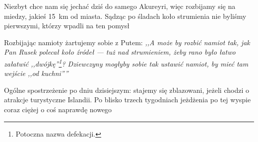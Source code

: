 Niezbyt chce nam się jechać dziś do samego Akureyri, więc rozbijamy się na miedzy, jakieś 15~km od miasta. Sądząc po śladach koło strumienia nie byliśmy pierwszymi, którzy wpadli na ten pomysł \grin

Rozbijając namioty żartujemy sobie z Putem: \emph{,,A może by rozbić namiot tak, jak Pan Rusek polecał koło źródeł --- tuż nad strumieniem, żeby rano było łatwo załatwić ,,dwójkę''\footnote{Potoczna nazwa defekacji.}? Dziewczyny mogłyby sobie tak ustawić namiot, by mieć tam wejście ,,od kuchni''\textellipsis''}


Ogólne spostrzeżenie po dniu dzisiejszym: stajemy się zblazowani, jeżeli chodzi o atrakcje turystyczne Islandii. Po blisko trzech tygodniach jeżdżenia po tej wyspie coraz ciężej o coś naprawdę nowego\textellipsis
